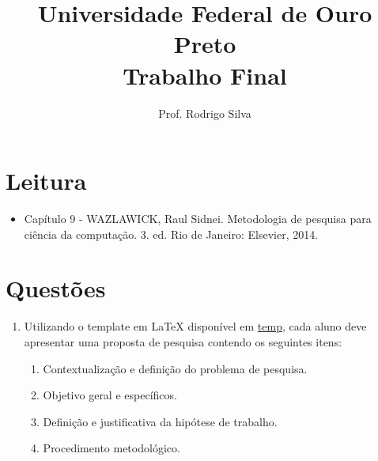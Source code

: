 \documentclass{article}
\title{\vspace{-2 cm}Universidade Federal de Ouro Preto \\ Trabalho Final}
\author{Prof. Rodrigo Silva}
\date{}
\begin{document}
\maketitle

\section{Leitura}

\begin{itemize}
    \item Capítulo 9 - WAZLAWICK, Raul Sidnei. Metodologia de pesquisa para ciência da computação. 3. ed. Rio de Janeiro: Elsevier, 2014.
\end{itemize}

\section{Questões}

\begin{enumerate}
\item Utilizando o template em LaTeX disponível em \url{temp}, cada aluno deve apresentar uma proposta de pesquisa contendo os seguintes itens:

\begin{enumerate}
    \item Contextualização e definição do problema de pesquisa.
    \item Objetivo geral e específicos.
    \item Definição e justificativa da hipótese de trabalho.
    \item Procedimento metodológico.
\end{enumerate} 

\end{enumerate}


%
%
\end{document}
